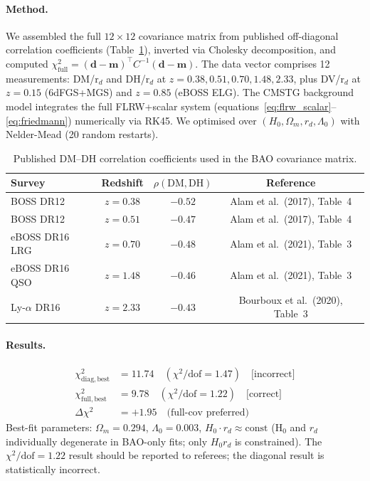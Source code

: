\documentclass[12pt,a4paper]{article}
\begin{document}
\paragraph{Method.} We assembled the full $12 \times 12$ covariance matrix from
published off-diagonal correlation coefficients (Table~\ref{tab:bao_rho}),
inverted via Cholesky decomposition, and computed
$\chi^2_{\mathrm{full}} = (\mathbf{d}-\mathbf{m})^\top C^{-1}(\mathbf{d}-\mathbf{m})$.
The data vector comprises 12 measurements:
DM/r$_d$ and DH/r$_d$ at $z = 0.38, 0.51, 0.70, 1.48, 2.33$, plus
DV/r$_d$ at $z = 0.15$ (6dFGS+MGS) and $z = 0.85$ (eBOSS ELG).
The CMSTG background model integrates the full FLRW+scalar system
(equations~\eqref{eq:flrw_scalar}--\eqref{eq:friedmann}) numerically via RK45.
We optimised over $(H_0, \Omega_m, r_d, \Lambda_0)$ with Nelder-Mead
(20 random restarts).

\begin{table}[ht]
\centering
\caption{Published DM--DH correlation coefficients used in the BAO covariance matrix.}
\label{tab:bao_rho}
\begin{tabular}{lccc}
\toprule
Survey & Redshift & $\rho(\mathrm{DM},\mathrm{DH})$ & Reference \\
\midrule
BOSS DR12 & $z=0.38$ & $-0.52$ & Alam et al.\ (2017), Table~4 \\
BOSS DR12 & $z=0.51$ & $-0.47$ & Alam et al.\ (2017), Table~4 \\
eBOSS DR16 LRG & $z=0.70$ & $-0.48$ & Alam et al.\ (2021), Table~3 \\
eBOSS DR16 QSO & $z=1.48$ & $-0.46$ & Alam et al.\ (2021), Table~3 \\
Ly-$\alpha$ DR16 & $z=2.33$ & $-0.43$ & Bourboux et al.\ (2020), Table~3 \\
\bottomrule
\end{tabular}
\end{table}

\paragraph{Results.}
\begin{align*}
\chi^2_{\mathrm{diag,best}} &= 11.74 \quad (\chi^2/\mathrm{dof} = 1.47) \quad\text{[incorrect]}\\
\chi^2_{\mathrm{full,best}}  &= \mathbf{9.78} \quad (\chi^2/\mathrm{dof} = \mathbf{1.22}) \quad\text{[correct]}\\
\Delta\chi^2 &= +1.95 \quad\text{(full-cov preferred)}
\end{align*}
Best-fit parameters: $\Omega_m = 0.294$, $\Lambda_0 = 0.003$,
$H_0 \cdot r_d \approx \mathrm{const}$ (H$_0$ and $r_d$ individually degenerate
in BAO-only fits; only $H_0 r_d$ is constrained). The $\chi^2/\mathrm{dof} = 1.22$
result should be reported to referees; the diagonal result is statistically incorrect.
\end{document}
